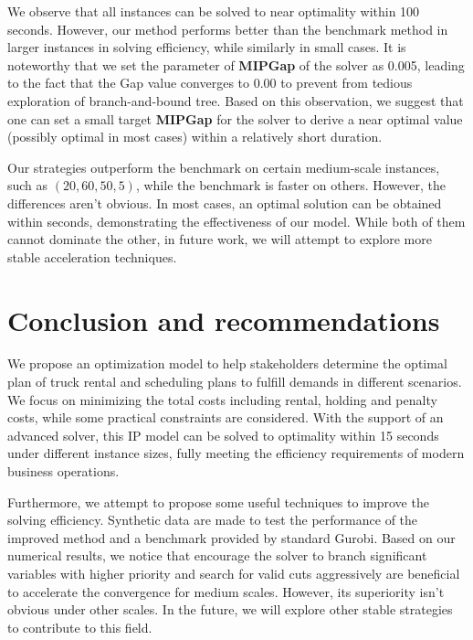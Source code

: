 \documentclass[a4paper,12pt]{article}
\begin{document}
We observe that all instances can be solved to near optimality within 100 seconds.
However, our method performs better than the benchmark method in larger instances in solving efficiency, while similarly in small cases.
It is noteworthy that we set the parameter of \textbf{MIPGap} of the solver as 0.005, leading to the fact that the Gap value converges to 0.00 to prevent from tedious exploration of branch-and-bound tree.
Based on this observation, we suggest that one can set a small target \textbf{MIPGap} for the solver to derive a near optimal value (possibly optimal in most cases) within a relatively short duration.

Our strategies outperform the benchmark on certain medium-scale instances, such as $(20, 60, 50, 5)$, while the benchmark is faster  on others.
However, the differences aren't obvious.
In most cases, an optimal solution can be obtained within seconds, demonstrating the effectiveness of our model.
While both of them cannot dominate the other, in future work, we will attempt to explore more stable acceleration techniques.







\section{Conclusion and recommendations}\label{sec:conclusion-and-recommendations}

We propose an optimization model to help stakeholders determine the optimal plan of truck rental and scheduling plans to fulfill demands in different scenarios.
We focus on minimizing the total costs including rental, holding and penalty costs, while some practical constraints are considered.
With the support of an advanced solver, this IP model can be solved to optimality within 15 seconds under different instance sizes, fully meeting the efficiency requirements of modern business operations.

Furthermore, we attempt to propose some useful techniques to improve the solving efficiency.
Synthetic data are made to test the performance of the improved method and a benchmark provided by standard Gurobi.
Based on our numerical results, we notice that encourage the solver to branch significant variables with higher priority and search for valid cuts aggressively are beneficial to accelerate the convergence for medium scales.
However, its superiority isn't obvious under other scales.
In the future, we will explore other stable strategies to contribute to this field.
\end{document}

